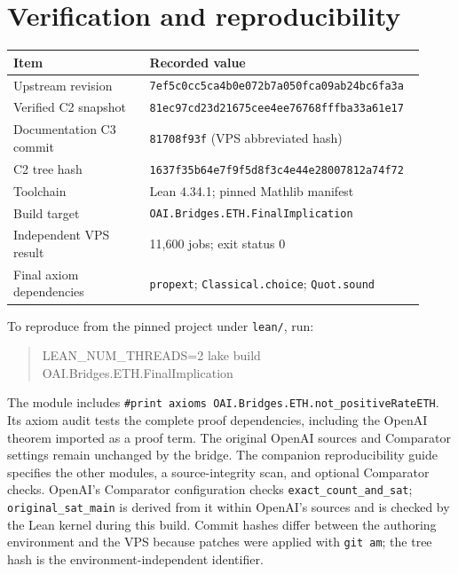 \documentclass[11pt,letterpaper]{article}
\newcommand{\lean}[1]{\texttt{#1}}
\begin{document}
\section{Verification and reproducibility}
\begin{center}\small
\begin{tabular}{@{}p{0.32\linewidth}p{0.60\linewidth}@{}}\toprule
Item&Recorded value\\\midrule
Upstream revision&\lean{7ef5c0cc5ca4b0e072b7a050fca09ab24bc6fa3a}\\
Verified C2 snapshot&\lean{81ec97cd23d21675cee4ee76768fffba33a61e17}\\
Documentation C3 commit&\lean{81708f93f} (VPS abbreviated hash)\\
C2 tree hash&\lean{1637f35b64e7f9f5d8f3c4e44e28007812a74f72}\\
Toolchain&Lean 4.34.1; pinned Mathlib manifest\\
Build target&\lean{OAI.\allowbreak{}Bridges.\allowbreak{}ETH.\allowbreak{}FinalImplication}\\
Independent VPS result&11,600 jobs; exit status 0\\
Final axiom dependencies&\lean{propext}; \lean{Classical.choice}; \lean{Quot.sound}\\\bottomrule
\end{tabular}
\end{center}
To reproduce from the pinned project under \lean{lean/}, run:
\begin{quote}\ttfamily\small
LEAN\_NUM\_THREADS=2 lake build OAI.Bridges.ETH.FinalImplication
\end{quote}
The module includes \lean{\#print axioms OAI.\allowbreak{}Bridges.\allowbreak{}ETH.\allowbreak{}not\_positiveRateETH}. Its axiom audit tests the complete proof dependencies, including the OpenAI theorem imported as a proof term. The original OpenAI sources and Comparator settings remain unchanged by the bridge. The companion reproducibility guide~\cite{bridge} specifies the other modules, a source-integrity scan, and optional Comparator checks. OpenAI's Comparator configuration checks \lean{exact\_count\_and\_sat}; \lean{original\_sat\_main} is derived from it within OpenAI's sources and is checked by the Lean kernel during this build. Commit hashes differ between the authoring environment and the VPS because patches were applied with \lean{git am}; the tree hash is the environment-independent identifier.
\end{document}

